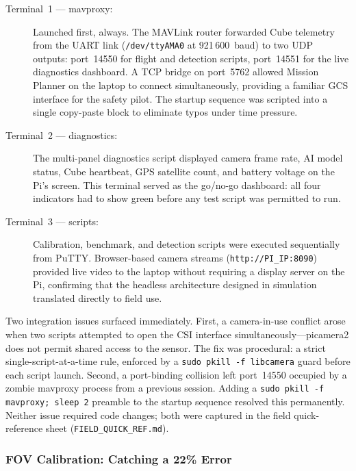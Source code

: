 \begin{description}
    \item[Terminal~1 --- mavproxy:] Launched first, always.  The MAVLink router forwarded Cube telemetry from the UART link (\texttt{/dev/ttyAMA0} at 921\,600~baud) to two UDP outputs: port~14550 for flight and detection scripts, port~14551 for the live diagnostics dashboard.  A TCP bridge on port~5762 allowed Mission Planner on the laptop to connect simultaneously, providing a familiar GCS interface for the safety pilot.  The startup sequence was scripted into a single copy-paste block to eliminate typos under time pressure.

    \item[Terminal~2 --- diagnostics:] The multi-panel diagnostics script displayed camera frame rate, AI model status, Cube heartbeat, GPS satellite count, and battery voltage on the Pi's screen.  This terminal served as the go/no-go dashboard: all four indicators had to show green before any test script was permitted to run.

    \item[Terminal~3 --- scripts:] Calibration, benchmark, and detection scripts were executed sequentially from PuTTY.  Browser-based camera streams (\texttt{http://PI\_IP:8090}) provided live video to the laptop without requiring a display server on the Pi, confirming that the headless architecture designed in simulation translated directly to field use.
\end{description}

Two integration issues surfaced immediately.  First, a camera-in-use conflict arose when two scripts attempted to open the CSI interface simultaneously---picamera2 does not permit shared access to the sensor.  The fix was procedural: a strict single-script-at-a-time rule, enforced by a \texttt{sudo pkill -f libcamera} guard before each script launch.  Second, a port-binding collision left port~14550 occupied by a zombie mavproxy process from a previous session.  Adding a \texttt{sudo pkill -f mavproxy; sleep 2} preamble to the startup sequence resolved this permanently.  Neither issue required code changes; both were captured in the field quick-reference sheet (\texttt{FIELD\_QUICK\_REF.md}).

\subsubsection{FOV Calibration: Catching a 22\% Error}\label{sec:field-fov}

